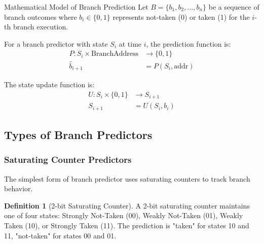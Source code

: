 \documentclass[11pt,a4paper]{article}
\theoremstyle{definition}
\newtheorem{definition}{Definition}[section]
\begin{document}
\begin{mathematicsbox}{Mathematical Model of Branch Prediction}
Let $B = \{b_1, b_2, \ldots, b_n\}$ be a sequence of branch outcomes where $b_i \in \{0, 1\}$ represents not-taken (0) or taken (1) for the $i$-th branch execution.

For a branch predictor with state $S_i$ at time $i$, the prediction function is:
\begin{align}
P: S_i \times \text{BranchAddress} &\rightarrow \{0, 1\} \\
\hat{b}_{i+1} &= P(S_i, \text{addr})
\end{align}

The state update function is:
\begin{align}
U: S_i \times \{0, 1\} &\rightarrow S_{i+1} \\
S_{i+1} &= U(S_i, b_i)
\end{align}
\end{mathematicsbox}

\subsection{Types of Branch Predictors}

\subsubsection{Saturating Counter Predictors}

The simplest form of branch predictor uses saturating counters to track branch behavior.

\begin{definition}[2-bit Saturating Counter]
A 2-bit saturating counter maintains one of four states: Strongly Not-Taken (00), Weakly Not-Taken (01), Weakly Taken (10), or Strongly Taken (11). The prediction is "taken" for states 10 and 11, "not-taken" for states 00 and 01.
\end{definition}
\end{document}
